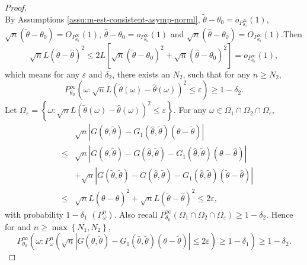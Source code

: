 \begin{proof}
\[\]
By Assumptions \ref{assu:m-est-consistent-asymp-norml}, $\tilde{\theta}-\theta_{0}=o_{P_{\theta_{0}}^{\infty}}\left(1\right)$,
$\sqrt{n}\left(\tilde{\theta}-\theta_{0}\right)=O_{P_{\theta_{0}}^{\infty}}\left(1\right)$,
$\hat{\theta}-\theta_{0}=o_{P_{\theta_{0}}^{\infty}}\left(1\right)$
and $\sqrt{n}\left(\hat{\theta}-\theta_{0}\right)=O_{P_{\theta_{0}}^{\infty}}\left(1\right).$Then
\[
\sqrt{n}L\left(\tilde{\theta}-\hat{\theta}\right)^{2}\le2L\left[\sqrt{n}\left(\tilde{\theta}-\theta_{0}\right)^{2}+\sqrt{n}\left(\hat{\theta}-\theta_{0}\right)^{2}\right]=o_{P_{\theta_{0}}^{\infty}}\left(1\right),
\]
which means for any $\varepsilon$ and $\delta_{2}$, there exists
an $N_{2}$, such that for any $n\ge N_{2}$, 
\[
P_{\theta_{0}}^{\infty}\left(\omega:\sqrt{n}L\left(\tilde{\theta}\left(\omega\right)-\hat{\theta}\left(\omega\right)\right)^{2}\le\varepsilon\right)\ge1-\delta_{2}.
\]
Let $\Omega_{\varepsilon}=\left\{ \omega:\sqrt{n}L\left(\tilde{\theta}\left(\omega\right)-\hat{\theta}\left(\omega\right)\right)^{2}\le\varepsilon\right\} $.
For any $\omega\in\Omega_{1}\cap\Omega_{2}\cap\Omega_{\varepsilon}$,
\begin{eqnarray*}
 &  & \sqrt{n}\left|G\left(\theta,\tilde{\theta}\right)-G_{1}\left(\hat{\theta},\tilde{\theta}\right)\left(\theta-\tilde{\theta}\right)\right|\\
 & \le & \sqrt{n}\left|G\left(\theta,\tilde{\theta}\right)-G\left(\hat{\theta},\tilde{\theta}\right)-G_{1}\left(\hat{\theta},\tilde{\theta}\right)\left(\theta-\hat{\theta}\right)\right|\\
 &  & +\sqrt{n}\left|G\left(\tilde{\theta},\tilde{\theta}\right)-G\left(\hat{\theta},\tilde{\theta}\right)-G_{1}\left(\hat{\theta},\tilde{\theta}\right)\left(\tilde{\theta}-\hat{\theta}\right)\right|\\
 & \le & \sqrt{n}L\left(\theta-\hat{\theta}\right)^{2}+\sqrt{n}L\left(\tilde{\theta}-\hat{\theta}\right)^{2}\le2\varepsilon,
\end{eqnarray*}
with probability $1-\delta_{1}$ $\left(P_{\omega}^{n}\right)$. Also
recall $P_{\theta_{0}}^{\infty}\left(\Omega_{1}\cap\Omega_{2}\cap\Omega_{\varepsilon}\right)\ge1-\delta_{2}$.
Hence for and $n\ge\max\left\{ N_{1},N_{2}\right\} $, 
\[
P_{\theta_{0}}^{\infty}\left(\omega:P_{\omega}^{n}\left(\sqrt{n}\left|G\left(\theta,\tilde{\theta}\right)-G_{1}\left(\hat{\theta},\tilde{\theta}\right)\left(\theta-\tilde{\theta}\right)\right|\le2\varepsilon\right)\ge1-\delta_{1}\right)\ge1-\delta_{2}.
\]
\end{proof}
